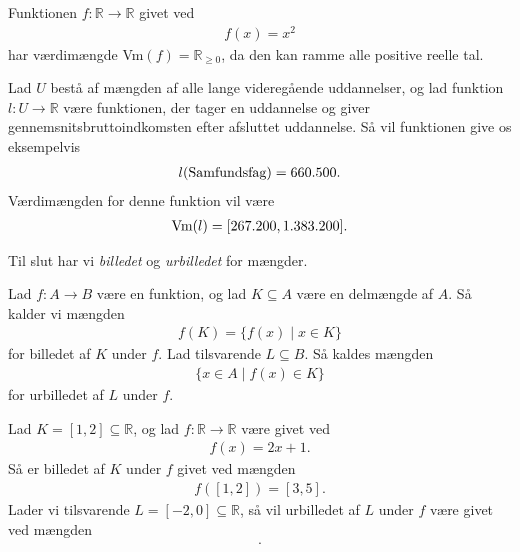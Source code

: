 \begin{exa}

Funktionen $f: \mathbb{R} \to \mathbb{R}$ givet ved
\begin{align*}
f(x) = x^2
\end{align*}
har værdimængde Vm$(f) = \mathbb{R}_{\geq 0}$, da den kan ramme alle positive reelle tal. 
\end{exa}

\begin{exa}\label{exa:udd}
Lad $U$ bestå af mængden af alle lange videregående uddannelser, og lad funktion $l:U \to \mathbb{R}$ være funktionen, der tager en uddannelse og giver gennemsnitsbruttoindkomsten efter afsluttet uddannelse. Så vil funktionen give os eksempelvis
\begin{align*}
l(\textnormal{Samfundsfag}) = 660.500.
\end{align*}
Værdimængden for denne funktion vil være
\begin{align*}
\textnormal{Vm}(l) = [267.200,1.383.200].
\end{align*}

\end{exa}

Til slut har vi \textit{billedet} og \textit{urbilledet} for mængder.
\begin{defn}
Lad $f:A \to B$ være en funktion, og lad $K\subseteq A$ være en delmængde af $A$. Så kalder vi mængden
\begin{align*}
f(K) = \{f(x) \mid x \in K\}
\end{align*}
for billedet af $K$ under $f$. 
Lad tilsvarende $L\subseteq B$. Så kaldes mængden 
\begin{align*}
 \{x \in A \mid f(x) \in K\}
\end{align*}
for urbilledet af $L$ under $f$.
\end{defn}

\begin{exa}
Lad $K = [1,2]\subseteq \mathbb{R}$, og lad $f:\mathbb{R} \to \mathbb{R}$ være givet ved
\begin{align*}
f(x) = 2x+1.
\end{align*}
Så er billedet af $K$ under $f$ givet ved mængden 
\begin{align*}
f([1,2]) = [3,5].
\end{align*}
Lader vi tilsvarende $L = [-2,0] \subseteq \mathbb{R}$, så vil urbilledet af $L$ under $f$ være givet ved mængden
\begin{align*}
[-1.5, -0.5].
\end{align*}
\end{exa}

